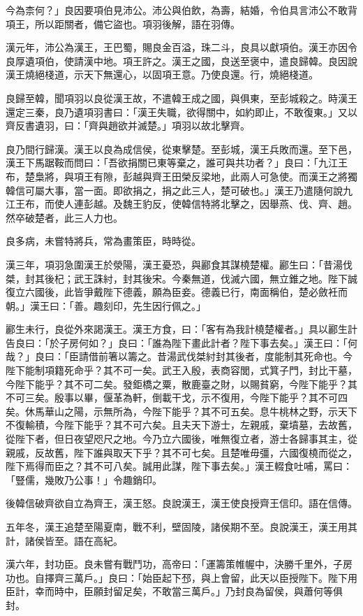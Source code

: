 \begin{pinyinscope}
今為柰何？」良因要項伯見沛公。沛公與伯飲，為壽，結婚，令伯具言沛公不敢背項王，所以距關者，備它盜也。項羽後解，語在羽傳。

漢元年，沛公為漢王，王巴蜀，賜良金百溢，珠二斗，良具以獻項伯。漢王亦因令良厚遺項伯，使請漢中地。項王許之。漢王之國，良送至褒中，遣良歸韓。良因說漢王燒絕棧道，示天下無還心，以固項王意。乃使良還。行，燒絕棧道。

良歸至韓，聞項羽以良從漢王故，不遣韓王成之國，與俱東，至彭城殺之。時漢王還定三秦，良乃遺項羽書曰：「漢王失職，欲得關中，如約即止，不敢復東。」又以齊反書遺羽，曰：「齊與趙欲并滅楚。」項羽以故北擊齊。

良乃間行歸漢。漢王以良為成信侯，從東擊楚。至彭城，漢王兵敗而還。至下邑，漢王下馬踞鞍而問曰：「吾欲捐關已東等棄之，誰可與共功者？」良曰：「九江王布，楚梟將，與項王有隙，彭越與齊王田榮反梁地，此兩人可急使。而漢王之將獨韓信可屬大事，當一面。即欲捐之，捐之此三人，楚可破也。」漢王乃遣隨何說九江王布，而使人連彭越。及魏王豹反，使韓信特將北擊之，因舉燕、伐、齊、趙。然卒破楚者，此三人力也。

良多病，未嘗特將兵，常為畫策臣，時時從。

漢三年，項羽急圍漢王於滎陽，漢王憂恐，與酈食其謀橈楚權。酈生曰：「昔湯伐桀，封其後杞；武王誅紂，封其後宋。今秦無道，伐滅六國，無立錐之地。陛下誠復立六國後，此皆爭戴陛下德義，願為臣妾。德義已行，南面稱伯，楚必斂衽而朝。」漢王曰：「善。趣刻印，先生因行佩之。」

酈生未行，良從外來謁漢王。漢王方食，曰：「客有為我計橈楚權者。」具以酈生計告良曰：「於子房何如？」良曰：「誰為陛下畫此計者？陛下事去矣。」漢王曰：「何哉？」良曰：「臣請借前箸以籌之。昔湯武伐桀紂封其後者，度能制其死命也。今陛下能制項籍死命乎？其不可一矣。武王入殷，表商容閭，式箕子門，封比干墓，今陛下能乎？其不可二矣。發鉅橋之粟，散鹿臺之財，以賜貧窮，今陛下能乎？其不可三矣。殷事以畢，偃革為軒，倒載干戈，示不復用，今陛下能乎？其不可四矣。休馬華山之陽，示無所為，今陛下能乎？其不可五矣。息牛桃林之野，示天下不復輸積，今陛下能乎？其不可六矣。且夫天下游士，左親戚，棄墳墓，去故舊，從陛下者，但日夜望咫尺之地。今乃立六國後，唯無復立者，游士各歸事其主，從親戚，反故舊，陛下誰與取天下乎？其不可七矣。且楚唯毋彊，六國復橈而從之，陛下焉得而臣之？其不可八矣。誠用此謀，陛下事去矣。」漢王輟食吐哺，罵曰：「豎儒，幾敗乃公事！」令趣銷印。

後韓信破齊欲自立為齊王，漢王怒。良說漢王，漢王使良授齊王信印。語在信傳。

五年冬，漢王追楚至陽夏南，戰不利，壁固陵，諸侯期不至。良說漢王，漢王用其計，諸侯皆至。語在高紀。

漢六年，封功臣。良未嘗有戰鬥功，高帝曰：「運籌策帷幄中，決勝千里外，子房功也。自擇齊三萬戶。」良曰：「始臣起下邳，與上會留，此天以臣授陛下。陛下用臣計，幸而時中，臣願封留足矣，不敢當三萬戶。」乃封良為留侯，與蕭何等俱封。


\end{pinyinscope}
